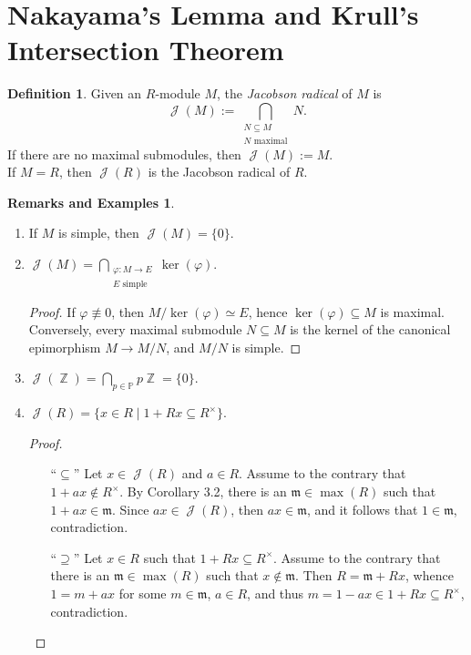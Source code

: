 \documentclass[12pt,a4paper]{report}
\theoremstyle{definition}
\newtheorem{defn}[theorem]{Definition}
\newtheorem*{remex}{Remarks and Examples}
\theoremstyle{num.custom-title}
\DeclareMathOperator{\J}{\mathcal{J}}
\DeclareMathOperator{\Z}{\mathbb{Z}}
\DeclareMathOperator{\sse}{\subseteq}
\newcommand{\m}{\mathfrak{m}}
\renewcommand{\phi}{\varphi}
\renewcommand{\P}{\mathbb{P}}
\begin{document}
\section{Nakayama's Lemma and Krull's Intersection Theorem}

\begin{defn}
Given an $R$-module $M$, the \emph{Jacobson radical} of $M$ is
\[
\J(M):= \bigcap_{\substack{N \sse M \\ N \text{ maximal}}} N.
\]
If there are no maximal submodules, then $\J(M):=M$.\\
If $M=R$, then $\J(R)$ is the Jacobson radical of $R$.
\end{defn}

\begin{remex}\ 
\begin{enumerate}
\item If $M$ is simple, then $\J(M)= \{0\}$.
\item $\J(M) = \displaystyle\bigcap_{\substack{\phi : M \to E \\ E \text{ simple}}} \ker (\phi)$.
\begin{proof}
If $\phi \not\equiv 0$, then $M/\ker(\phi) \simeq E$, hence $\ker(\phi) \sse M$ is maximal.\\
Conversely, every maximal submodule $N \sse M$ is the kernel of the canonical epimorphism $M \to M/N$, and $M/N$ is simple.
\end{proof}
\item $\J(\Z) = \displaystyle\bigcap_{p \in \P} p\Z = \{0\}$.
\item $\J(R) = \{ x \in R \mid 1+Rx \sse R^\times \}$.
\begin{proof}\ 
\begin{itemize}
\item[``$\sse$''] Let $x \in \J(R)$ and $a \in R$. Assume to the contrary that $1+ax \not\in R^\times$. By Corollary 3.2, there is an $\m \in \max(R)$ such that $1+ax \in \m$. Since $ax \in \J(R)$, then $ax \in \m$, and it follows that $1 \in \m$, contradiction.
\item[``$\supseteq$''] Let $x \in R$ such that $1+Rx \sse R^\times$. Assume to the contrary that there is an $\m \in \max(R)$ such that $x \not\in \m$. Then $R=\m+Rx$, whence $1=m+ax$ for some $m \in \m$, $a \in R$, and thus $m = 1-ax \in 1+Rx \sse R^\times$, contradiction.
\end{itemize}
\end{proof}
\end{enumerate}
\end{remex}
\end{document}
